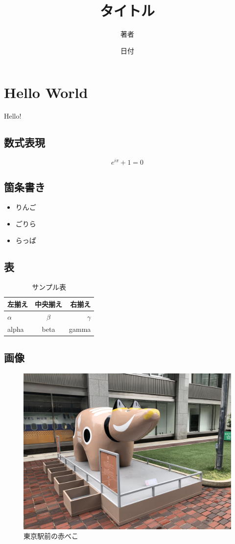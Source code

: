 \documentclass{article}
\title{タイトル}
\author{著者}
\date{日付}
\begin{document}
    \maketitle
    \newpage

    \section{Hello World}
    Hello!
    \subsection{数式表現}
    \begin{equation}
        e^{i\pi}+1=0
    \end{equation}

    \subsection{箇条書き}
    \begin{itemize}
        \item りんご
        \item ごりら
        \item らっぱ
    \end{itemize}

    \subsection{表}
    \begin{table}[htbp]
        \centering
        \caption{サンプル表}
        \begin{tabular}{|l|c|r|}
            \hline
            左揃え & 中央揃え & 右揃え \\
            \hline
            $\alpha$ & $\beta$ & $\gamma$ \\
            \hline
            alpha & beta & gamma \\
            \hline
        \end{tabular}
    \end{table}

    \subsection{画像}
    \begin{figure}
        \includegraphics[width=\linewidth]{akabeko.jpg}
        \caption{東京駅前の赤べこ}        
    \end{figure}
\end{document}

